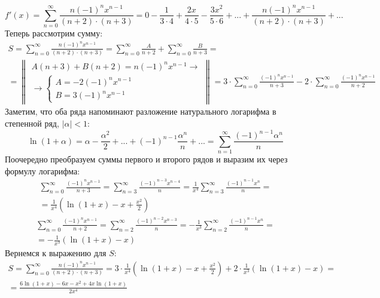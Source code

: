 \documentclass[a5paper, 10pt]{article}
\theoremstyle{definition}
\theoremstyle{plain}
\theoremstyle{remark}
\begin{document}
\begin{equation*}
f'(x) = \sum  \limits_{n = 0}^{\infty} \frac{n (-1)^n x^{n-1}}{(n+ 2) \cdot(n+ 3)} = 
0 - \frac{1}{3 \cdot 4} + \frac{2x}{4 \cdot 5} - \frac{3x^2}{5 \cdot 6}+... + \frac{n (-1)^n x^{n-1}}{(n+ 2) \cdot(n+ 3)} +...
\end{equation*}
Теперь рассмотрим сумму:
\begin{multline*}
S = \sum  \limits_{n = 0}^{\infty}  \frac{n (-1)^n x^{n-1}}{(n+ 2) \cdot(n+ 3)} =  \sum  \limits_{n = 0}^{\infty}   \frac{A}{n+ 2} +  \sum  \limits_{n = 0}^{\infty}   \frac{B}{n+ 3} =\\ =
\begin{Vmatrix}
A(n+3) + B(n+2) = n(-1)^n x^{n-1} \to\\
\to 
 \begin{cases}
   A = -2(-1)^n x^{n-1}\\
   B = 3(-1)^n x^{n-1}
 \end{cases}
\end{Vmatrix}
= 3 \cdot \sum  \limits_{n = 0}^{\infty}   \frac{(-1)^n x^{n-1}}{n+ 3} - 2 \cdot \sum  \limits_{n = 0}^{\infty}   \frac{(-1)^n x^{n-1}}{n+ 2}
\end{multline*}
Заметим, что оба ряда напоминают разложение натурального логарифма в степенной ряд, $\left| \alpha \right| < 1$:
\begin{equation*}
\ln(1+\alpha) = \alpha - \frac{\alpha^2}{2}+ ... + (-1)^{n-1}\frac{\alpha^n}{n} + ... = \sum  \limits_{n = 1}^{\infty}\frac{(-1)^{n-1} \alpha^n}{n}
\end{equation*}
Поочередно преобразуем суммы первого и второго рядов и выразим их через формулу логарифма:
\begin{multline*}
 \sum  \limits_{n = 0}^{\infty}   \frac{(-1)^n x^{n-1}}{n+ 3} =  \sum  \limits_{n = 3}^{\infty}   \frac{(-1)^{n-3} x^{n-4}}{n} =
\frac{1}{x^4}\sum  \limits_{n = 3}^{\infty}   \frac{(-1)^{n-1} x^{n}}{n} = \\ = \frac{1}{x^4}\left(\ln(1+ x) - x + \frac{x^2}{2}  \right)
\end{multline*}
\begin{multline*}
 \sum  \limits_{n = 0}^{\infty}   \frac{(-1)^n x^{n-1}}{n+ 2} =  \sum  \limits_{n = 2}^{\infty}   \frac{(-1)^{n-2} x^{n-3}}{n} =
-\frac{1}{x^3}\sum  \limits_{n = 2}^{\infty}   \frac{(-1)^{n-1} x^{n}}{n} = \\ = -\frac{1}{x^3}\left(\ln(1+ x) - x \right)
\end{multline*}
Вернемся к выражению для $S$:
\begin{multline*}
S = \sum  \limits_{n = 0}^{\infty}  \frac{n (-1)^n x^{n-1}}{(n+ 2) \cdot(n+ 3)} = 3 \cdot \frac{1}{x^4}\left(\ln(1+ x) - x + \frac{x^2}{2}  \right) + 2\cdot \frac{1}{x^3}\left(\ln(1+ x) - x \right) = \\
= \frac{6\ln (1+x) - 6x - x^2 + 4x \ln (1+x)}{2x^4}
\end{multline*}
\end{document}

